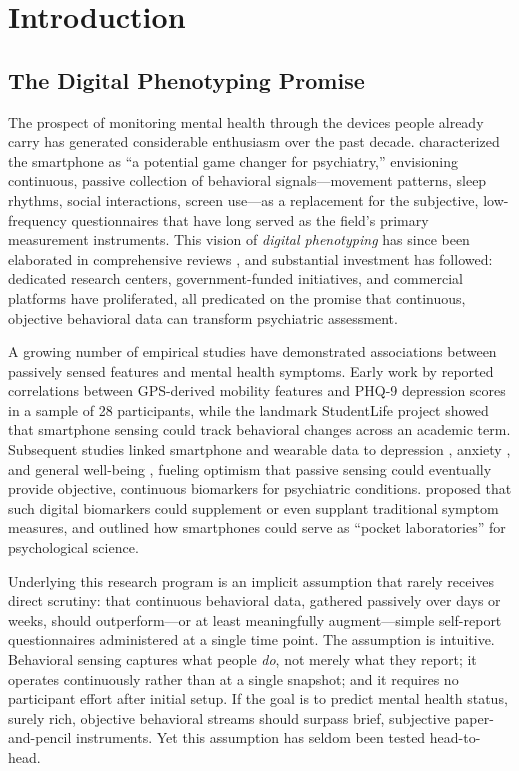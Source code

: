 \documentclass[12pt, a4paper]{article}
\begin{document}
\section{Introduction}

\subsection{The Digital Phenotyping Promise}

The prospect of monitoring mental health through the devices people already carry has generated considerable enthusiasm over the past decade. \citet{insel2018digital} characterized the smartphone as ``a potential game changer for psychiatry,'' envisioning continuous, passive collection of behavioral signals---movement patterns, sleep rhythms, social interactions, screen use---as a replacement for the subjective, low-frequency questionnaires that have long served as the field's primary measurement instruments. This vision of \textit{digital phenotyping} has since been elaborated in comprehensive reviews \citep{torous2021growing, onnela2016harnessing, mohr2017personal}, and substantial investment has followed: dedicated research centers, government-funded initiatives, and commercial platforms have proliferated, all predicated on the promise that continuous, objective behavioral data can transform psychiatric assessment.

A growing number of empirical studies have demonstrated associations between passively sensed features and mental health symptoms. Early work by \citet{saeb2015mobile} reported correlations between GPS-derived mobility features and PHQ-9 depression scores in a sample of 28 participants, while the landmark StudentLife project \citep{wang2014studentlife} showed that smartphone sensing could track behavioral changes across an academic term. Subsequent studies linked smartphone and wearable data to depression \citep{chikersal2021detecting, wang2018sensing}, anxiety \citep{sano2018identifying}, and general well-being \citep{ben2015next}, fueling optimism that passive sensing could eventually provide objective, continuous biomarkers for psychiatric conditions. \citet{jacobson2019digital} proposed that such digital biomarkers could supplement or even supplant traditional symptom measures, and \citet{harari2016using} outlined how smartphones could serve as ``pocket laboratories'' for psychological science.

Underlying this research program is an implicit assumption that rarely receives direct scrutiny: that continuous behavioral data, gathered passively over days or weeks, should outperform---or at least meaningfully augment---simple self-report questionnaires administered at a single time point. The assumption is intuitive. Behavioral sensing captures what people \textit{do}, not merely what they report; it operates continuously rather than at a single snapshot; and it requires no participant effort after initial setup. If the goal is to predict mental health status, surely rich, objective behavioral streams should surpass brief, subjective paper-and-pencil instruments. Yet this assumption has seldom been tested head-to-head.
\end{document}
